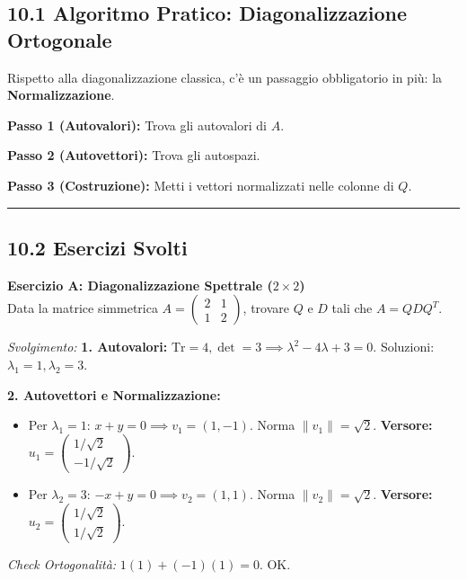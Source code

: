 \documentclass[10pt,a4paper]{article}
\begin{document}
\vspace{0.4cm}

\subsection*{10.1 Algoritmo Pratico: Diagonalizzazione Ortogonale}
Rispetto alla diagonalizzazione classica, c'è un passaggio obbligatorio in più: la \textbf{Normalizzazione}.

\textbf{Passo 1 (Autovalori):} Trova gli autovalori di $A$.

\textbf{Passo 2 (Autovettori):} Trova gli autospazi.

\textbf{Passo 3 (Costruzione):} Metti i vettori normalizzati nelle colonne di $Q$.

\vspace{0.4cm}
\hrule
\vspace{0.4cm}

\subsection*{10.2 Esercizi Svolti}

\textbf{Esercizio A: Diagonalizzazione Spettrale ($2\times2$)}
\\ Data la matrice simmetrica $A = \begin{pmatrix} 2 & 1 \\ 1 & 2 \end{pmatrix}$, trovare $Q$ e $D$ tali che $A = Q D Q^T$.

\textit{Svolgimento:}
\textbf{1. Autovalori:}
$\text{Tr}=4, \det=3 \implies \lambda^2 - 4\lambda + 3 = 0$. Soluzioni: $\lambda_1 = 1, \lambda_2 = 3$.

\textbf{2. Autovettori e Normalizzazione:}
\begin{itemize}
    \item Per $\lambda_1 = 1$: $x+y=0 \implies v_1 = (1, -1)$.
    Norma $\|v_1\| = \sqrt{2}$. \textbf{Versore:} $u_1 = \begin{pmatrix} 1/\sqrt{2} \\ -1/\sqrt{2} \end{pmatrix}$.
    
    \item Per $\lambda_2 = 3$: $-x+y=0 \implies v_2 = (1, 1)$.
    Norma $\|v_2\| = \sqrt{2}$. \textbf{Versore:} $u_2 = \begin{pmatrix} 1/\sqrt{2} \\ 1/\sqrt{2} \end{pmatrix}$.
\end{itemize}
\textit{Check Ortogonalità:} $1(1) + (-1)(1) = 0$. OK.
\end{document}
